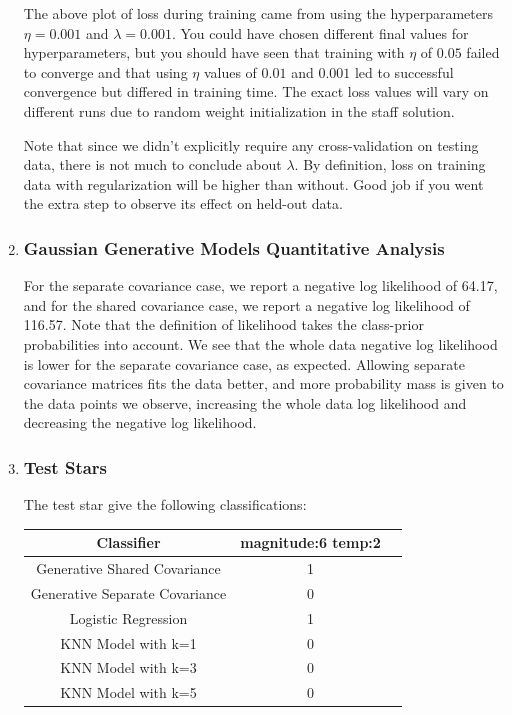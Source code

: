 \documentclass[submit]{harvardml}
\begin{document}
\begin{enumerate}
        The above plot of loss during training came from using the hyperparameters $\eta = 0.001$ and $\lambda = 0.001$. You could have chosen different final values for hyperparameters, but you should have seen that training with $\eta$ of $0.05$ failed to converge and that using $\eta$ values of $0.01$ and $0.001$ led to successful convergence but differed in training time. The exact loss values will vary on different runs due to random weight initialization in the staff solution.

        Note that since we didn't explicitly require any cross-validation on testing data, there is not much to conclude about $\lambda$. By definition, loss on training data with regularization will be higher than without. Good job if you went the extra step to observe its effect on held-out data.

        \item \subsubsection*{Gaussian Generative Models Quantitative Analysis}

        For the separate covariance case, we report a negative log likelihood of 64.17, and for the shared covariance case, we report a negative log likelihood of 116.57. Note that the definition of likelihood takes the class-prior probabilities into account. We see that the whole data negative log likelihood is lower for the separate covariance case, as expected.  Allowing separate covariance matrices fits the data better, and more probability mass is given to the data points we observe, increasing the whole data log likelihood and decreasing the negative log likelihood.

        \item \subsubsection*{Test Stars}

        The test star give the following classifications:
        \begin{center}
        \begin{tabular}{|c|c|c|}
        \hline
        Classifier & magnitude:6 temp:2 \\
        \hline
        Generative Shared Covariance & 1 \\
        \hline
        Generative Separate Covariance & 0 \\
        \hline
        Logistic Regression & 1 \\
        \hline
        KNN Model with k=1 & 0 \\
        \hline
        KNN Model with k=3 & 0 \\
        \hline
        KNN Model with k=5 & 0 \\
        \hline


\end{tabular}
\end{center}
\end{enumerate}
\end{document}
